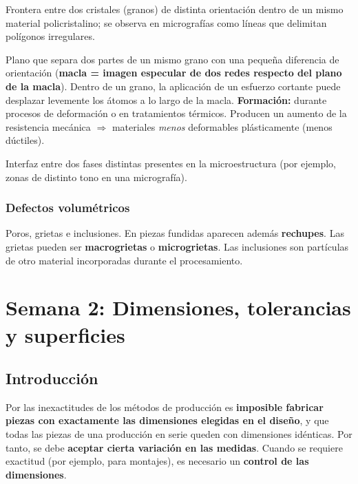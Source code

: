 \documentclass[12pt,a4paper]{article}
\begin{document}
\begin{description}[leftmargin=0pt,style=nextline]
	\item[1. Borde o límite de grano] Frontera entre dos cristales (granos) de
	      distinta orientación dentro de un mismo material policristalino; se
	      observa en
	      micrografías como líneas que delimitan polígonos irregulares.
	\item[2. Planos de macla] Plano que separa dos partes de un mismo grano con
	      una pequeña diferencia de orientación (\textbf{macla = imagen especular
		      de dos
		      redes respecto del plano de la macla}). Dentro de un grano, la
	      aplicación de un
	      esfuerzo cortante puede desplazar levemente los átomos a lo largo de la
	      macla.
	      \textbf{Formación:} durante procesos de deformación o en tratamientos
	      térmicos.
	      Producen un aumento de la resistencia mecánica $\Rightarrow$ materiales
	      \emph{menos} deformables plásticamente (menos dúctiles).
	\item[3. Límites de fase] Interfaz entre dos fases distintas presentes en la
	      microestructura (por ejemplo, zonas de distinto tono en una
	      micrografía).
\end{description}

\subsubsection{Defectos volumétricos}
Poros, grietas e inclusiones. En piezas fundidas aparecen además
\textbf{rechupes}. Las grietas pueden ser \textbf{macrogrietas} o
\textbf{microgrietas}. Las inclusiones son partículas de otro material
incorporadas durante el procesamiento.

\section{Semana 2: Dimensiones, tolerancias y superficies}

\subsection{Introducción}
Por las inexactitudes de los métodos de producción es \textbf{imposible fabricar
	piezas con exactamente las dimensiones elegidas en el diseño}, y que todas las
piezas de una producción en serie queden con dimensiones idénticas. Por tanto,
se debe \textbf{aceptar cierta variación en las medidas}. Cuando se requiere
exactitud (por ejemplo, para montajes), es necesario un \textbf{control de las
	dimensiones}.
\end{document}

